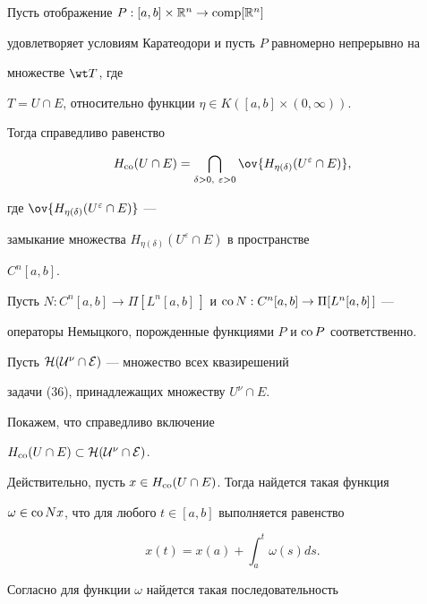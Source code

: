 \begin{cor} Пусть отображение $P:[a,b]\times\Bbb R^n\to\operatorname{comp}[\Bbb R^n]$


удовлетворяет условиям Каратеодори и пусть $P$ равномерно непрерывно на


множестве $\wt T$, где


$T=U\cap E$, относительно функции $\eta\in K([a,b]\times(0,\infty))$.


Тогда справедливо равенство


\begin{equation}


H_{\co}(U\cap E)=


\bigcap_{\delta>0,\ \varepsilon>0}


\ov{H_{\eta(\delta)}(U^\varepsilon\cap E)},


\end{equation}


где $\ov{H_{\eta(\delta)}(U^\varepsilon\cap E)}$ ---


замыкание множества $H_{\eta(\delta)}(U^\varepsilon\cap E)$ в пространстве


$C^n[a,b]$.


\end{cor}





Пусть $N:C^n[a,b]\to\Pi[L^n[a,b]\,]$ и $\operatorname{co} N:C^n[a,b]\to\Pi[L^n[a,b]\,]$ ---


операторы Немыцкого, порожденные функциями $P$ и $\operatorname{co} P$ соответственно.


Пусть $\cal H(U^\nu\cap E)$ --- множество всех квазирешений


задачи (36), принадлежащих множеству $U^\nu\cap E$.





Покажем, что справедливо включение


$H_{\operatorname{co}}(U\cap E)\subset\cal H(U^\nu\cap E)$.


Действительно, пусть $x\in H_{\operatorname{co}}(U\cap E)$. Тогда найдется такая функция


$\omega\in\operatorname{co} Nx$, что для любого $t\in[a,b]$ выполняется равенство


\begin{equation}


x(t)=x(a)+\int_a^t\omega(s)ds.


\end{equation}


Согласно \cite{9} для функции $\omega$ найдется такая последовательность


